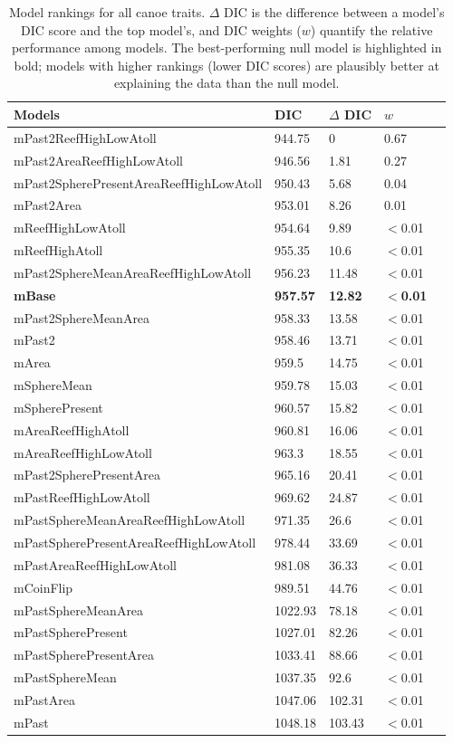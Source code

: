 

\begin{table}
\begin{center}
\begin{tabular}{lllll}
Models & DIC & $\Delta$ DIC & $w$\\
\hline
mPast2ReefHighLowAtoll & 944.75 & 0 & 0.67\\
mPast2AreaReefHighLowAtoll & 946.56 & 1.81 & 0.27\\
mPast2SpherePresentAreaReefHighLowAtoll & 950.43 & 5.68 & 0.04\\
mPast2Area & 953.01 & 8.26 & 0.01\\
mReefHighLowAtoll & 954.64 & 9.89 & $<$0.01\\
mReefHighAtoll & 955.35 & 10.6 & $<$0.01\\
mPast2SphereMeanAreaReefHighLowAtoll & 956.23 & 11.48 & $<$0.01\\
\textbf{mBase} & \textbf{957.57} & \textbf{12.82} & \textbf{$<$0.01}\\
mPast2SphereMeanArea & 958.33 & 13.58 & $<$0.01\\
mPast2 & 958.46 & 13.71 & $<$0.01\\
mArea & 959.5 & 14.75 & $<$0.01\\
mSphereMean & 959.78 & 15.03 & $<$0.01\\
mSpherePresent & 960.57 & 15.82 & $<$0.01\\
mAreaReefHighAtoll & 960.81 & 16.06 & $<$0.01\\
mAreaReefHighLowAtoll & 963.3 & 18.55 & $<$0.01\\
mPast2SpherePresentArea & 965.16 & 20.41 & $<$0.01\\
mPastReefHighLowAtoll & 969.62 & 24.87 & $<$0.01\\
mPastSphereMeanAreaReefHighLowAtoll & 971.35 & 26.6 & $<$0.01\\
mPastSpherePresentAreaReefHighLowAtoll & 978.44 & 33.69 & $<$0.01\\
mPastAreaReefHighLowAtoll & 981.08 & 36.33 & $<$0.01\\
mCoinFlip & 989.51 & 44.76 & $<$0.01\\
mPastSphereMeanArea & 1022.93 & 78.18 & $<$0.01\\
mPastSpherePresent & 1027.01 & 82.26 & $<$0.01\\
mPastSpherePresentArea & 1033.41 & 88.66 & $<$0.01\\
mPastSphereMean & 1037.35 & 92.6 & $<$0.01\\
mPastArea & 1047.06 & 102.31 & $<$0.01\\
mPast & 1048.18 & 103.43 & $<$0.01\\
\end{tabular}
\end{center}
\caption{Model rankings for all canoe traits. $\Delta$ DIC is the difference between a model's DIC score and the top model's, and DIC weights ($w$) quantify the relative performance among models.  The best-performing null model is highlighted in bold; models with higher rankings (lower DIC scores) are plausibly better at explaining the data than the null model.
\label{resultstable1}}
\end{table}



